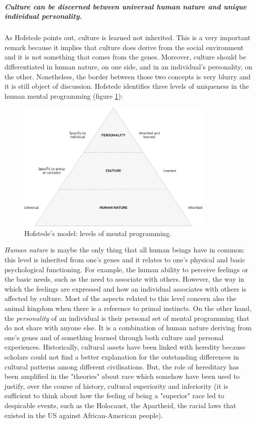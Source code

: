 \documentclass[../main.tex]{subfiles}
\begin{document}
\subparagraph*{Culture can be discerned between universal human nature and unique individual personality.} As Hofstede points out, culture is learned not inherited. This is a very important remark because it implies that culture does derive from the social environment and it is not something that comes from the genes. Moreover, culture should be differentiated in human nature, on one side, and in an individual's personality, on the other. Nonetheless, the border between those two concepts is very blurry and it is still object of discussion. Hofstede identifies three levels of uniqueness in the human mental programming (figure \ref{hofstede}):
\begin{figure}[h]
    \centering\includegraphics[width=0.85\textwidth]{images/levels-1}
    \caption{Hofstede's model: levels of mental programming.}
    \label{hofstede}
\end{figure}

\textit{Human nature} is maybe the only thing that all human beings have in common: this level is inherited from one's genes and it relates to one's physical and basic psychological functioning. For example, the human ability to perceive feelings or the basic needs, such as the need to associate with others. However, the way in which the feelings are expressed and how an individual associates with others is affected by culture. Most of the aspects related to this level concern also the animal kingdom when there is a reference to primal instincts. On the other hand, the \textit{personality} of an individual is their personal set of mental programming that do not share with anyone else. It is a combination of human nature deriving from one's genes and of something learned through both culture and personal experiences. Historically, cultural assets have been linked with heredity because scholars could not find a better explanation for the outstanding differences in cultural patterns among different civilisations. But, the role of hereditary has been amplified in the "theories" about race which somehow have been used to justify, over the course of history, cultural superiority and inferiority (it is sufficient to think about how the feeling of being a "superior" race led to despicable events, such as the Holocaust, the Apartheid, the racial laws that existed in the US against African-American people).
\end{document}
